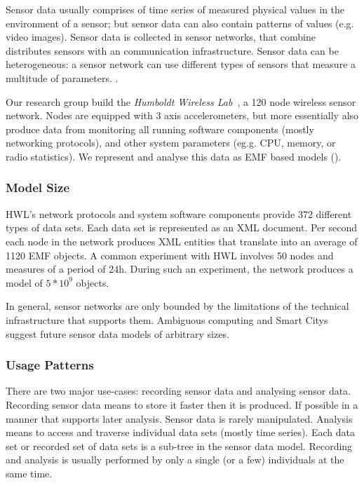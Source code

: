 Sensor data usually comprises of time series of measured physical values in the environment of a sensor; but sensor data can also contain patterns of values (e.g. video images). Sensor data is collected in sensor networks, that combine distributes sensors with an communication infrastructure. Sensor data can be heterogeneous: a sensor network can use different types of sensors that measure a multitude of parameters. \cite{estrin,lynch}. 

Our research group build the \emph{Humboldt Wireless Lab}~\cite{hwl}, a 120 node wireless sensor network. Nodes are equipped with 3 axis accelerometers, but more essentially also produce data from monitoring all running software components (mostly networking protocols), and other system parameters (eg.g. CPU, memory, or radio statistics). We represent and analyse this data as EMF based models (\cite{clickwatch}).

\subsubsection*{Model Size}
HWL's network protocols and system software components provide 372 different types of data sets. Each data set is represented as an XML document. Per second each node in the network produces XML entities that translate into an average of 1120 EMF objects. A common experiment with HWL involves 50 nodes and measures of a period of 24h. During such an experiment, the network produces a model of $5*10^9$ objects. 

In general, sensor networks are only bounded by the limitations of the technical infrastructure that supports them. Ambiguous computing and Smart Citys suggest future sensor data models of arbitrary sizes. 

\subsubsection*{Usage Patterns}
There are two major use-cases: recording sensor data and analysing sensor data. Recording sensor data means to store it faster then it is produced. If possible in a manner that supports later analysis. Sensor data is rarely manipulated. Analysis means to access and traverse individual data sets (mostly time series). Each data set or recorded set of data sets is a sub-tree in the sensor data model. Recording and analysis is usually performed by only a single (or a few) individuals at the same time. 

